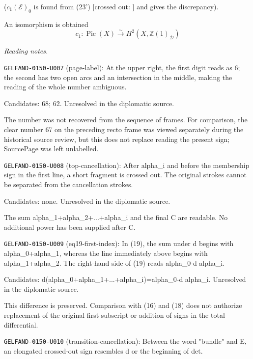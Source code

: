 ($c_1(\mathcal E)_0$ is found from (23')
[crossed out: ]
and gives the discrepancy).

An isomorphism is obtained
\begin{equation*}
c_1:\operatorname{Pic}(X)\overset{\sim}{\longrightarrow}H^2(X,\mathbb Z(1)_{\mathcal D})\tag{25}
\end{equation*}


\par\smallskip\noindent\textit{Reading notes.}\par
\noindent\texttt{GELFAND-0150-U007} (page-label): At the upper right, the first digit reads as 6; the second has two open arcs and an intersection in the middle, making the reading of the whole number ambiguous.\par
Candidates: 68; 62. Unresolved in the diplomatic source.\par
The number was not recovered from the sequence of frames. For comparison, the clear number 67 on the preceding recto frame was viewed separately during the historical source review, but this does not replace reading the present sign; SourcePage was left unlabelled.\par
\noindent\texttt{GELFAND-0150-U008} (top-cancellation): After alpha\_i and before the membership sign in the first line, a short fragment is crossed out. The original strokes cannot be separated from the cancellation strokes.\par
Candidates: none. Unresolved in the diplomatic source.\par
The sum alpha\_1+alpha\_2+...+alpha\_i and the final C are readable. No additional power has been supplied after C.\par
\noindent\texttt{GELFAND-0150-U009} (eq19-first-index): In (19), the sum under d begins with alpha\_0+alpha\_1, whereas the line immediately above begins with alpha\_1+alpha\_2. The right-hand side of (19) reads alpha\_0-d alpha\_i.\par
Candidates: d(alpha\_0+alpha\_1+...+alpha\_i)=alpha\_0-d alpha\_i. Unresolved in the diplomatic source.\par
This difference is preserved. Comparison with (16) and (18) does not authorize replacement of the original first subscript or addition of signs in the total differential.\par
\noindent\texttt{GELFAND-0150-U010} (transition-cancellation): Between the word "bundle" and E, an elongated crossed-out sign resembles d or the beginning of det.\par

